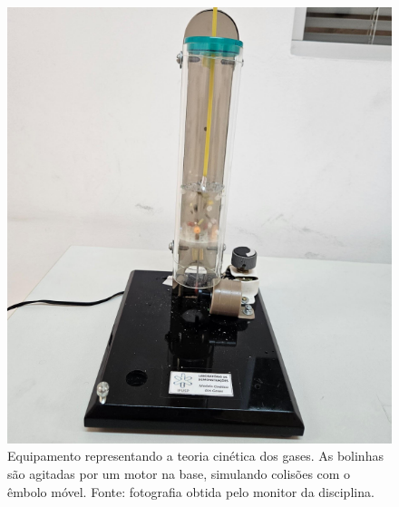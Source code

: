 \begin{figure}[H]
\centering
\includegraphics[width=0.45\linewidth]{fig/cinetica.png}
\caption{Equipamento representando a teoria cinética dos gases. As bolinhas são agitadas por um motor na base, simulando colisões com o êmbolo móvel. Fonte: fotografia obtida pelo monitor da disciplina.}
\label{fig:cinetica}
\end{figure}
